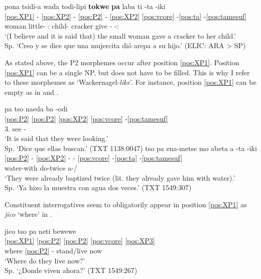 \documentclass[output=paper,hidelinks]{langscibook}
\begin{document}
\ea \label{araona:ex:p2*}
    \glll *pona tsidi-a wada todi-lipi \textbf{tokwe} \textbf{pa} laba ti -ta -iki   \\
    \ref{pos:XP1} - \ref{pos:XP2} - \ref{pos:P2} - \ref{pos:XP2} \ref{pos:vcore} -\ref{pos:ta} -\ref{pos:tamesuf} \\
    woman little-\Erg{} \Tsg{}:\Gen{} child-\Dim{} \textbf{\Epis{}} \textbf{\Rep{}} cracker give -\Third\Aarg{} -\Recp{}:\Pst{}   \\
    \glt `(I believe and it is said that) the small woman gave a cracker to her child.' \\ Sp. `Creo y se dice que una mujercita dió arepa a su hijo.'  \hfill (ELIC: ARA > SP)
\z 


As stated above, the P2 morphemes occur after position \ref{pos:XP1}. Position \ref{pos:XP1} can be a single NP, but does not have to be filled. This is why I refer to these morphemes as `Wackernagel-\textit{like}'. For instance, position \ref{pos:XP1} can be empty as in  and .

\ea \label{araona:ex:p2a}
 \ea
    \glll pa tso naeda ba -odi	  \\
    \ref{pos:P2} \ref{pos:P2} \ref{pos:XP2} \ref{pos:vcore} -\ref{pos:tamesuf} \\
    \Rep{} \Ant{} 3.\Pl{} see -\Freq{} \\
    \glt `It is said that they were looking.' \\ Sp. `Dice que ellas buscan.'  \hfill (TXT 1138:0047)
 \ex \label{araona:ex:p2b}
    \glll tso pa ena-metse mo abeta a -ta -iki  \\
     \ref{pos:P2} - \ref{pos:XP2} - - \ref{pos:vcore} -\ref{pos:ta} -\ref{pos:tamesuf} \\
    \Ant{} \Rep{} water-with \Foc{} do-twice a-\Third\Aarg{}/\Pl{} \\
    \glt `They were already baptized twice (lit. they already gave him with water).' \\ Sp. `Ya hizo la muestra con agua dos veces.'  \hfill (TXT 1549:307)
 \z
\z 

Constituent interrogatives seem to obligatorily appear in position \ref{pos:XP1} as \textit{jico} `where' in .

\ea \label{ex:jico}
    \glll jico tso pa neti bewewe  \\
     \ref{pos:XP1} \ref{pos:P2} \ref{pos:P2} \ref{pos:vcore} \ref{pos:XP3} \\
      where \ref{pos:P2} - stand/live now \\
    \glt `Where do they live now?' \\ Sp. `¿Donde viven ahora?'  \hfill (TXT 1549:267)
\z 
\end{document}

